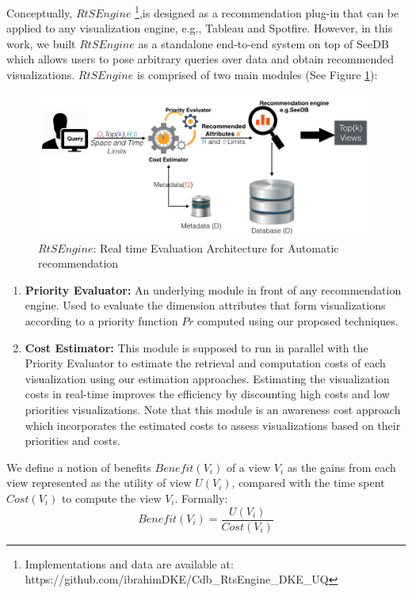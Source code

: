 Conceptually, $RtSEngine$ \footnote{Implementations and data are available at:\\ https://github.com/ibrahimDKE/Cdb\_RtsEngine\_DKE\_UQ},is designed as a recommendation plug-in that can be applied to any visualization engine, e.g., Tableau and Spotfire.
%
However, in this work, we built $RtSEngine$ as a standalone end-to-end system on top of SeeDB which allows users to pose arbitrary queries over data and obtain recommended visualizations.
%
$RtSEngine$ is comprised of two main modules (See Figure \ref{fig:arch}):
%
\begin{figure}[t]
\centering
\includegraphics[width=\textwidth]{arch_new.png}
\caption{$RtSEngine$: Real time Evaluation Architecture for Automatic recommendation}
\label{fig:arch}%
\end{figure}
%
\begin{enumerate}
\item \textbf{Priority Evaluator:} An underlying module in front of any recommendation engine. 
%
Used to evaluate the dimension attributes that form visualizations according to a priority function $Pr$ computed using our proposed techniques.
%
\item \textbf{Cost Estimator:} This module is supposed to run in parallel with the Priority Evaluator to estimate the retrieval and computation costs of each visualization using our estimation approaches. 
%
Estimating the visualization costs in real-time improves the efficiency by discounting high costs and low priorities visualizations. 
%
Note that this module is an awareness cost approach which incorporates the estimated costs to assess visualizations based on their priorities and costs.
%
\end{enumerate}
%
We define a notion of benefits $Benefit(V_i)$ of a view $V_i$ as the gains from each view represented as the utility of view $U(V_i)$, compared with the time spent $Cost(V_i)$ to compute the view $V_i$.
%
Formally:
%
\begin{equation}
\label{eq:profit}
Benefit(V_i)= \frac{U(V_i)}{Cost(V_i)}
\end{equation}
%

